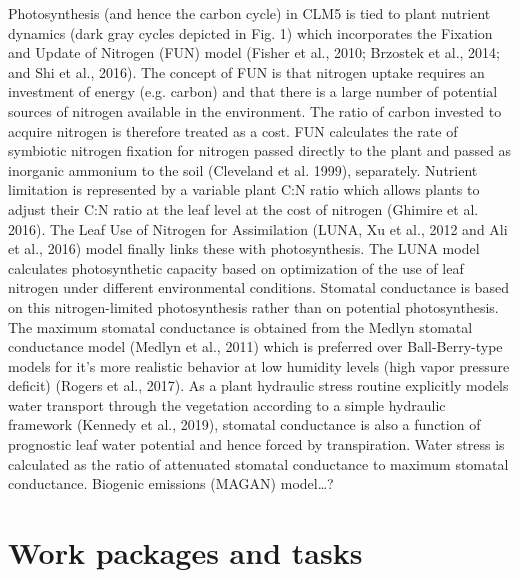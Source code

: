 \documentclass[11pt, letter, oneside, article]{memoir}
\begin{document}
Photosynthesis (and hence the carbon cycle) in CLM5 is tied to plant nutrient dynamics (dark gray cycles depicted in Fig. 1) which incorporates the Fixation and Update of Nitrogen (FUN) model (Fisher et al., 2010; Brzostek et al., 2014; and Shi et al., 2016). The concept of FUN is that nitrogen uptake requires an investment of energy (e.g. carbon) and that there is a large number of potential sources of nitrogen available in the environment. The ratio of carbon invested to acquire nitrogen is therefore treated as a cost. FUN calculates the rate of symbiotic nitrogen fixation for nitrogen passed directly to the plant and passed as inorganic ammonium to the soil (Cleveland et al. 1999), separately. Nutrient limitation is represented by a variable plant C:N ratio which allows plants to adjust their C:N ratio at the leaf level at the cost of nitrogen (Ghimire et al. 2016). The Leaf Use of Nitrogen for Assimilation (LUNA, Xu et al., 2012 and Ali et al., 2016) model finally links these with photosynthesis. The LUNA model calculates photosynthetic capacity based on optimization of the use of leaf nitrogen under different environmental conditions. Stomatal conductance is based on this nitrogen-limited photosynthesis rather than on potential photosynthesis. The maximum stomatal conductance is obtained from the Medlyn stomatal conductance model (Medlyn et al., 2011) which is preferred over Ball-Berry-type models for it’s more realistic behavior at low humidity levels (high vapor pressure deficit) (Rogers et al., 2017).  
As a plant hydraulic stress routine explicitly models water transport through the vegetation according to a simple hydraulic framework (Kennedy et al., 2019), stomatal conductance is also a function of prognostic leaf water potential and hence forced by transpiration. Water stress is calculated as the ratio of attenuated stomatal conductance to maximum stomatal conductance.
Biogenic emissions (MAGAN) model…?

\chapter{Work packages and tasks}

\printglossaries

\newpage
\printbibliography[env=bibliography]
\end{document}
